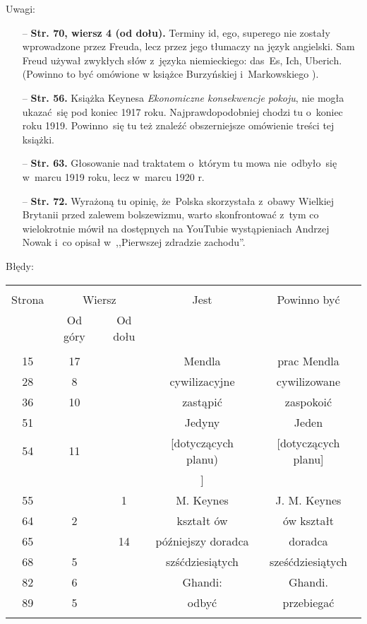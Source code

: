 \documentclass[a4paper,11pt]{article}
\newcommand{\Str}[1]{\textbf{Str. #1.}}
\newcommand{\StrWd}[2]{\textbf{Str. #1, wiersz #2 (od dołu).}}
\begin{document}
Uwagi:
\begin{itemize}
\item[--] \StrWd{70}{4} Terminy id, ego, superego nie zostały
  wprowadzone przez Freuda, lecz przez jego tłumaczy na język
  angielski. Sam Freud używał zwykłych słów z~języka niemieckiego:
  das~Es, Ich, Uberich. (Powinno to być omówione w książce Burzyńskiej
  i~Markowskiego \cite{BM09}).
\item[--] \Str{56} Książka Keynesa \emph{Ekonomiczne konsekwencje
    pokoju}, nie mogła ukazać~się pod koniec 1917
  roku. Najprawdopodobniej chodzi tu o~koniec roku 1919. Powinno~się
  tu też znaleźć obszerniejsze omówienie treści tej książki.
\item[--] \Str{63} Głosowanie nad traktatem o~którym tu mowa
  nie~odbyło~się w~marcu 1919 roku, lecz w~marcu 1920 r.
\item[--] \Str{72} Wyrażoną tu opinię, że~Polska skorzystała z~obawy
  Wielkiej Brytanii przed zalewem bolszewizmu, warto skonfrontować
  z~tym co wielokrotnie mówił na dostępnych na YouTubie wystąpieniach
  Andrzej Nowak i~co opisał w~,,Pierwszej zdradzie zachodu''.
\end{itemize}

Błędy:\\
\begin{center}
  \begin{tabular}{|c|c|c|c|c|}
    \hline
    & \multicolumn{2}{c|}{} & & \\
    Strona & \multicolumn{2}{c|}{Wiersz}& Jest & Powinno być \\ \cline{2-3}
    & Od góry & Od dołu &  &  \\ \hline
    & & & & \\
    15 & 17 & & Mendla & prac Mendla \\
    28 & 8 & & cywilizacyjne & cywilizowane \\
    36 & 10 & & zastąpić & zaspokoić \\
    51 & & & Jedyny & Jeden \\
    54 & 11 & & [dotyczących planu) & [dotyczących planu] \\
    & & & ] & \\
    55 & & 1 & M. Keynes & J. M. Keynes \\
    64 & 2 & & kształt ów & ów kształt \\
    65 & & 14 & późniejszy doradca & doradca \\
    68 & 5 & & szśćdziesiątych & sześćdziesiątych \\
    82 & 6 & & Ghandi: & Ghandi. \\
    89 & 5 & & odbyć & przebiegać \\
    & & & & \\ \hline
  \end{tabular}
\end{center}
\end{document}
